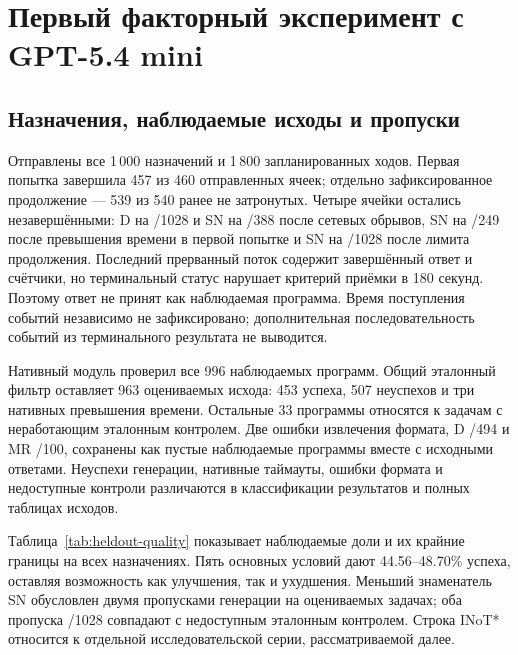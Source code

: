 







\section{Первый факторный эксперимент с GPT-5.4 mini}
\label{sec:primary-results}
\subsection{Назначения, наблюдаемые исходы и пропуски}
Отправлены все 1\,000 назначений и 1\,800 запланированных ходов. Первая попытка завершила 457 из 460 отправленных ячеек; отдельно зафиксированное продолжение --- 539 из 540 ранее не затронутых. Четыре ячейки остались незавершёнными: D на /1028 и SN на /388 после сетевых обрывов, SN на /249 после превышения времени в первой попытке и SN на /1028 после лимита продолжения. Последний прерванный поток содержит завершённый ответ и счётчики, но терминальный статус нарушает критерий приёмки в 180 секунд. Поэтому ответ не принят как наблюдаемая программа. Время поступления событий независимо не зафиксировано; дополнительная последовательность событий из терминального результата не выводится.

Нативный модуль проверил все 996 наблюдаемых программ. Общий эталонный фильтр оставляет 963 оцениваемых исхода: 453 успеха, 507 неуспехов и три нативных превышения времени. Остальные 33 программы относятся к задачам с неработающим эталонным контролем. Две ошибки извлечения формата, D /494 и MR /100, сохранены как пустые наблюдаемые программы вместе с исходными ответами. Неуспехи генерации, нативные таймауты, ошибки формата и недоступные контроли различаются в классификации результатов и полных таблицах исходов.

Таблица~\ref{tab:heldout-quality} показывает наблюдаемые доли и их крайние границы на всех назначениях. Пять основных условий дают 44.56--48.70\% успеха, оставляя возможность как улучшения, так и ухудшения. Меньший знаменатель SN обусловлен двумя пропусками генерации на оцениваемых задачах; оба пропуска /1028 совпадают с недоступным эталонным контролем. Строка INoT* относится к отдельной исследовательской серии, рассматриваемой далее.


